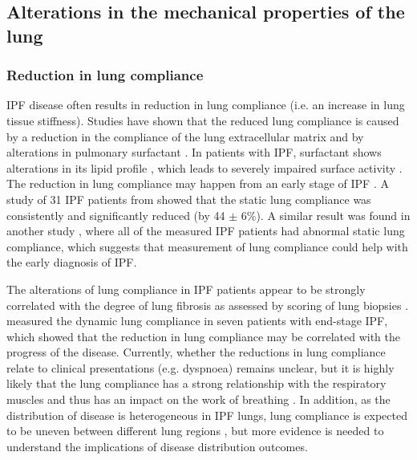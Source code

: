 \subsection{Alterations in the mechanical properties of the lung} \label{MechanicalAlteration}
\subsubsection{Reduction in lung compliance}
IPF disease often results in reduction in lung compliance (i.e. an increase in lung tissue stiffness). Studies have shown that the reduced lung compliance is caused by a reduction in the compliance of the lung extracellular matrix and by alterations in pulmonary surfactant \citep{plantier2018physiology}. In patients with IPF, surfactant shows alterations in its lipid profile \citep{gunther1999surfactant, schmidt2002altered}, which leads to severely impaired surface activity \citep{gunther1999surfactant}. The reduction in lung compliance may happen from an early stage of IPF \citep{plantier2018physiology}. A study of 31 IPF patients from \citep{zielonka2010angiogenic} showed that the static lung compliance was consistently and significantly reduced (by 44 $\pm$ 6\%). A similar result was found in another study \citep{orens1995sensitivity}, where all of the measured IPF patients had abnormal static lung compliance, which suggests that measurement of lung compliance could help with the early diagnosis of IPF.

The alterations of lung compliance in IPF patients appear to be strongly correlated with the degree of lung fibrosis as assessed by scoring of lung biopsies \citep{fulmer1979morphologic,plantier2018physiology}. \cite{nava1999lung} measured the dynamic lung compliance in seven patients with end-stage IPF, which showed that the reduction in lung compliance may be correlated with the progress of the disease. Currently, whether the reductions in lung compliance relate to clinical presentations (e.g. dyspnoea) remains unclear, but it is highly likely that the lung compliance has a strong relationship with the respiratory muscles and thus has an impact on the work of breathing \citep{plantier2018physiology}. In addition, as the distribution of disease is heterogeneous in IPF lungs, lung compliance is expected to be uneven between different lung regions \citep{organ2015structural}, but more evidence is needed to understand the implications of disease distribution outcomes.

